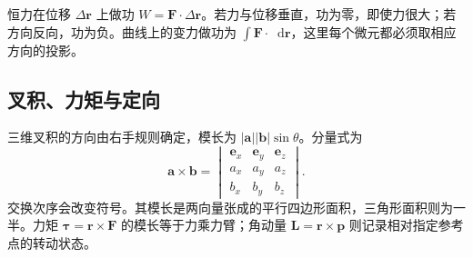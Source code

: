 \documentclass[11pt,openany,fontset=fandol]{ctexbook}
\theoremstyle{plain}\newtheorem{theorem}{定理}[chapter]\newtheorem{proposition}[theorem]{命题}
\theoremstyle{definition}\newtheorem{definition}{定义}[chapter]\newtheorem{example}{例}[chapter]
\theoremstyle{remark}\newtheorem*{remark}{说明}
\newcommand{\dd}{\mathop{}\!\mathrm d}\newcommand{\ii}{\mathrm i}\newcommand{\ee}{\mathrm e}
\newcommand{\vct}[1]{\bm{#1}}\newcommand{\Rea}{\operatorname{Re}}\newcommand{\Ima}{\operatorname{Im}}
\begin{document}
恒力在位移 $\Delta\vct r$ 上做功 $W=\vct F\cdot\Delta\vct r$。若力与位移垂直，功为零，即使力很大；若方向反向，功为负。曲线上的变力做功为 $\int\vct F\cdot\dd\vct r$，这里每个微元都必须取相应方向的投影。

\subsection{叉积、力矩与定向}
三维叉积的方向由右手规则确定，模长为 $|\vct a||\vct b|\sin\theta$。分量式为
\begin{equation}
\vct a\times\vct b=
\begin{vmatrix}\vct e_x&\vct e_y&\vct e_z\\a_x&a_y&a_z\\b_x&b_y&b_z\end{vmatrix}.
\end{equation}
交换次序会改变符号。其模长是两向量张成的平行四边形面积，三角形面积则为一半。力矩 $\vct\tau=\vct r\times\vct F$ 的模长等于力乘力臂；角动量 $\vct L=\vct r\times\vct p$ 则记录相对指定参考点的转动状态。
\end{document}
